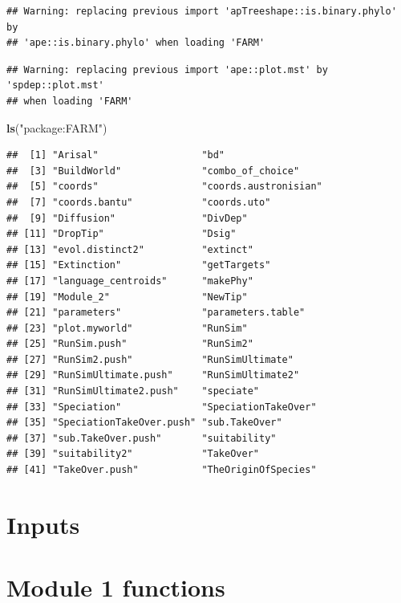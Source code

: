 \documentclass[]{book}
\newenvironment{Shaded}{\begin{snugshade}}{\end{snugshade}}
\newcommand{\KeywordTok}[1]{\textcolor[rgb]{0.13,0.29,0.53}{\textbf{{#1}}}}
\newcommand{\StringTok}[1]{\textcolor[rgb]{0.31,0.60,0.02}{{#1}}}
\newcommand{\NormalTok}[1]{{#1}}
\theoremstyle{definition}
\theoremstyle{definition}
\theoremstyle{remark}
\begin{document}
\begin{verbatim}
## Warning: replacing previous import 'apTreeshape::is.binary.phylo' by
## 'ape::is.binary.phylo' when loading 'FARM'
\end{verbatim}

\begin{verbatim}
## Warning: replacing previous import 'ape::plot.mst' by 'spdep::plot.mst'
## when loading 'FARM'
\end{verbatim}

\begin{Shaded}
\begin{Highlighting}[]
\KeywordTok{ls}\NormalTok{(}\StringTok{"package:FARM"}\NormalTok{)}
\end{Highlighting}
\end{Shaded}

\begin{verbatim}
##  [1] "Arisal"                  "bd"                     
##  [3] "BuildWorld"              "combo_of_choice"        
##  [5] "coords"                  "coords.austronisian"    
##  [7] "coords.bantu"            "coords.uto"             
##  [9] "Diffusion"               "DivDep"                 
## [11] "DropTip"                 "Dsig"                   
## [13] "evol.distinct2"          "extinct"                
## [15] "Extinction"              "getTargets"             
## [17] "language_centroids"      "makePhy"                
## [19] "Module_2"                "NewTip"                 
## [21] "parameters"              "parameters.table"       
## [23] "plot.myworld"            "RunSim"                 
## [25] "RunSim.push"             "RunSim2"                
## [27] "RunSim2.push"            "RunSimUltimate"         
## [29] "RunSimUltimate.push"     "RunSimUltimate2"        
## [31] "RunSimUltimate2.push"    "speciate"               
## [33] "Speciation"              "SpeciationTakeOver"     
## [35] "SpeciationTakeOver.push" "sub.TakeOver"           
## [37] "sub.TakeOver.push"       "suitability"            
## [39] "suitability2"            "TakeOver"               
## [41] "TakeOver.push"           "TheOriginOfSpecies"
\end{verbatim}

\section{Inputs}\label{inputs}

\section{Module 1 functions}\label{module-1-functions}
\end{document}
